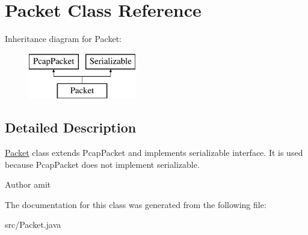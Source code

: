 \hypertarget{class_packet}{\section{Packet Class Reference}
\label{class_packet}
}
Inheritance diagram for Packet\-:\begin{figure}[H]
\begin{center}
\leavevmode
\includegraphics[height=2.000000cm]{class_packet}
\end{center}
\end{figure}


\subsection{Detailed Description}
\hyperlink{class_packet}{Packet} class extends Pcap\-Packet and implements serializable interface. It is used because Pcap\-Packet does not implement serializable.

\begin{DoxyAuthor}{Author}
amit 
\end{DoxyAuthor}


The documentation for this class was generated from the following file\-:\begin{DoxyCompactItemize}
\item 
src/Packet.\-java\end{DoxyCompactItemize}
